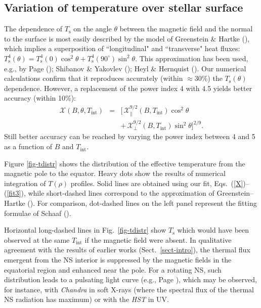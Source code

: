 \documentclass{aa}
\begin{document}
\subsection{Variation of temperature over stellar surface}
\label{sect-Tvar}
%
The dependence of $T_\mathrm{s}$ on the angle
$\theta$ between the magnetic field and the normal
to the surface is most easily
described by the model of Greenstein \& Hartke (\cite{gh83}),
which implies a superposition of ``longitudinal"
and ``transverse" heat fluxes:
$T_\mathrm{s}^4(\theta)=T_\mathrm{s}^4(0)\cos^2\theta 
+T_\mathrm{s}^4(90^\circ)\sin^2\theta $.
This approximation has been used, 
e.g., by Page (\cite{page95}); Shibanov \& Yakovlev (\cite{shibyak});
Heyl \& Hernquist (\cite{hh-theory}).
Our numerical calculations confirm that it reproduces accurately
(within $\approx30$\%) the $T_\mathrm{s}(\theta)$ dependence.
However, a replacement of the power index 4 with 4.5
yields better accuracy (within 10\%):
%
\begin{eqnarray}
 \mathcal{X}(B,\theta,T_\mathrm{int}) & = &
      \big[ \,\mathcal{X}_\|^{9/2}(B,T_\mathrm{int})  \cos^2\theta
\nonumber\\&&
   + \,\mathcal{X}_\perp^{9/2}(B,T_\mathrm{int}) \sin^2\theta \big]^{2/9}.
 \label{fit3}
\end{eqnarray}
%
Still better accuracy can be reached by varying the power index
between 4 and 5 as a function of $B$ and $T_\mathrm{int}$.

Figure \ref{fig-tdistr} shows the distribution of the effective
temperature from the magnetic pole to the equator. 
Heavy dots show the results of numerical integration
of $T(\rho)$ profiles.
Solid lines are obtained using our fit,
Eqs.~(\ref{X})--(\ref{fit3}),
while short-dashed lines correspond to the
approximation of Greenstein--Hartke (\cite{gh83}).
For comparison, dot-dashed lines
on the left panel represent the fitting formulae 
of Schaaf (\cite{schaaf90a,schaaf}).

Horizontal long-dashed lines in Fig.~\ref{fig-tdistr}
show $T_\mathrm{s}$ which would have been observed at the same
$T_\mathrm{int}$ if the magnetic field were absent.
In qualitative agreement with the results
of earlier works (Sect.\ \ref{sect-intro}),
the thermal flux emergent from the NS interior
is suppressed by the magnetic fields
in the equatorial region and enhanced near the pole.
For a rotating NS, such distribution leads to a pulsating 
light curve (e.g., Page \cite{page95}),
which may be observed, for instance, with \emph{Chandra}
in soft X-rays (where the spectral flux of the
thermal NS radiation has maximum)
or with the \emph{HST} in UV.
\end{document}

